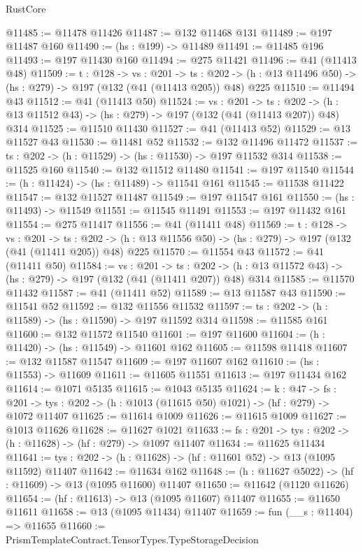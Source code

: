 \begin{lexlean}{RustCore}
\begin{coremodule}
@11485 := @11478 @11426
@11487 := @132 @11468 @131
@11489 := @197 @11487 @160
@11490 := (hs : @199) -> @11489
@11491 := @11485 @196
@11493 := @197 @11430 @160
@11494 := @275 @11421
@11496 := @41 (@11413 @48)
@11509 := {t : @128} ->
  {vs : @201} ->
  {ts : @202} -> (h : @13 @11496 @50) -> (hs : @279) -> @197 (@132 (@41 (@11413 @205)) @48) @225
@11510 := @11494 @43
@11512 := @41 (@11413 @50)
@11524 := {vs : @201} ->
  {ts : @202} -> (h : @13 @11512 @43) -> (hs : @279) -> @197 (@132 (@41 (@11413 @207)) @48) @314
@11525 := @11510 @11430
@11527 := @41 (@11413 @52)
@11529 := @13 @11527 @43
@11530 := @11481 @52
@11532 := @132 @11496 @11472
@11537 := {ts : @202} -> (h : @11529) -> (hs : @11530) -> @197 @11532 @314
@11538 := @11525 @160
@11540 := @132 @11512 @11480
@11541 := @197 @11540
@11544 := (h : @11424) -> (hs : @11489) -> @11541 @161
@11545 := @11538 @11422
@11547 := @132 @11527 @11487
@11549 := @197 @11547 @161
@11550 := (hs : @11493) -> @11549
@11551 := @11545 @11491
@11553 := @197 @11432 @161
@11554 := @275 @11417
@11556 := @41 (@11411 @48)
@11569 := {t : @128} ->
  {vs : @201} ->
  {ts : @202} -> (h : @13 @11556 @50) -> (hs : @279) -> @197 (@132 (@41 (@11411 @205)) @48) @225
@11570 := @11554 @43
@11572 := @41 (@11411 @50)
@11584 := {vs : @201} ->
  {ts : @202} -> (h : @13 @11572 @43) -> (hs : @279) -> @197 (@132 (@41 (@11411 @207)) @48) @314
@11585 := @11570 @11432
@11587 := @41 (@11411 @52)
@11589 := @13 @11587 @43
@11590 := @11541 @52
@11592 := @132 @11556 @11532
@11597 := {ts : @202} -> (h : @11589) -> (hs : @11590) -> @197 @11592 @314
@11598 := @11585 @161
@11600 := @132 @11572 @11540
@11601 := @197 @11600
@11604 := (h : @11420) -> (hs : @11549) -> @11601 @162
@11605 := @11598 @11418
@11607 := @132 @11587 @11547
@11609 := @197 @11607 @162
@11610 := (hs : @11553) -> @11609
@11611 := @11605 @11551
@11613 := @197 @11434 @162
@11614 := @1071 @5135
@11615 := @1043 @5135
@11624 := {k : @47} ->
  {fs : @201} -> {tys : @202} -> (h : @1013 (@11615 @50) @1021) -> (hf : @279) -> @1072 @11407
@11625 := @11614 @1009
@11626 := @11615 @1009
@11627 := @1013 @11626
@11628 := @11627 @1021
@11633 := {fs : @201} -> {tys : @202} -> (h : @11628) -> (hf : @279) -> @1097 @11407
@11634 := @11625 @11434
@11641 := {tys : @202} -> (h : @11628) -> (hf : @11601 @52) -> @13 (@1095 @11592) @11407
@11642 := @11634 @162
@11648 := (h : @11627 @5022) -> (hf : @11609) -> @13 (@1095 @11600) @11407
@11650 := @11642 (@1120 @11626)
@11654 := (hf : @11613) -> @13 (@1095 @11607) @11407
@11655 := @11650 @11611
@11658 := @13 (@1095 @11434) @11407
@11659 := fun (__s : @11404) => @11655
@11660 := PrismTemplateContract.TensorTypes.TypeStorageDecision

\end{coremodule}
\end{lexlean}
